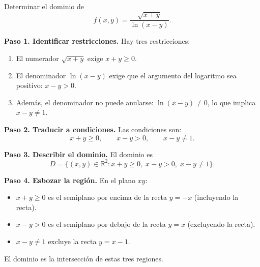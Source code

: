 \begin{example}
Determinar el dominio de
\[
f(x,y) = \frac{\sqrt{x+y}}{\ln(x-y)}.
\]
\begin{myproof}
\textbf{Paso 1. Identificar restricciones.}
Hay tres restricciones:
\begin{enumerate}
  \item El numerador $\sqrt{x+y}$ exige $x+y \geq 0$.
  \item El denominador $\ln(x-y)$ exige que el argumento del logaritmo
        sea positivo: $x-y > 0$.
  \item Además, el denominador no puede anularse: $\ln(x-y) \neq 0$,
        lo que implica $x-y \neq 1$.
\end{enumerate}

\textbf{Paso 2. Traducir a condiciones.}
Las condiciones son:
\[
x+y \geq 0, \qquad x-y > 0, \qquad x-y \neq 1.
\]

\textbf{Paso 3. Describir el dominio.}
El dominio es
\[
D = \{(x,y) \in \mathbb{R}^2 : x+y \geq 0,\; x-y > 0,\; x-y \neq 1\}.
\]

\textbf{Paso 4. Esbozar la región.}
En el plano $xy$:
\begin{itemize}
  \item $x+y \geq 0$ es el semiplano por encima de la recta $y = -x$
        (incluyendo la recta).
  \item $x-y > 0$ es el semiplano por debajo de la recta $y = x$
        (excluyendo la recta).
  \item $x-y \neq 1$ excluye la recta $y = x-1$.
\end{itemize}
El dominio es la intersección de estas tres regiones.


\end{myproof}
\end{example}

